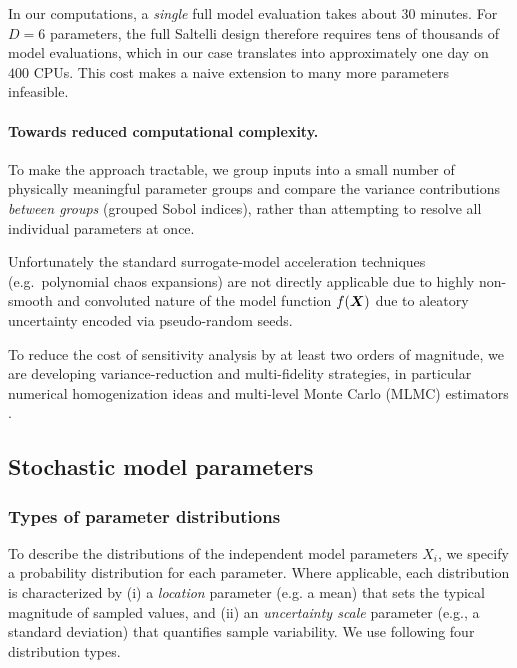 In our computations, a \emph{single} full model evaluation takes about
$30$ minutes. For $D=6$ parameters, the full Saltelli design therefore requires
tens of thousands of model evaluations, which in our case translates into
approximately one day on $400$ CPUs. This cost makes a naive extension to many
more parameters infeasible.

\paragraph{Towards reduced computational complexity.}
To make the approach tractable, we group inputs into a small number of
physically meaningful parameter groups and compare the variance
contributions \emph{between groups} (grouped Sobol indices), rather than
attempting to resolve all individual parameters at once.

Unfortunately the standard surrogate-model acceleration techniques
(e.g.\ polynomial chaos expansions) are not directly applicable
due to highly non-smooth and convoluted nature of the model function $f({\bm{X}})$
due to aleatory uncertainty encoded via pseudo-random seeds.

To reduce the cost of sensitivity analysis by at least two orders of magnitude,
we are developing variance-reduction and multi-fidelity strategies, in
particular numerical homogenization ideas \cite{Spetlik_Convolutional_2026} and
multi-level Monte Carlo (MLMC) estimators \cite{Giles2015}.

\subsection{Stochastic model parameters}

\subsubsection{Types of parameter distributions}
To describe the distributions of the independent model parameters $X_i$, we
specify a probability distribution for each parameter. Where applicable, each
distribution is characterized by
(i) a \emph{location} parameter (e.g. a mean) that sets the typical magnitude
of sampled values, and
(ii) an \emph{uncertainty scale} parameter (e.g., a standard deviation) that
quantifies sample variability.
We use following four distribution types.

